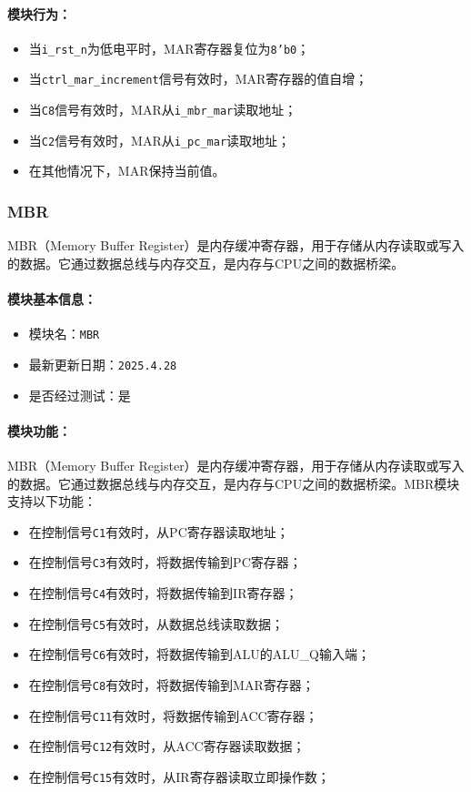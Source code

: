 \documentclass[lang=cn,a4paper,newtx]{elegantpaper}
\begin{document}
\paragraph{模块行为：}
\begin{itemize}
  \item 当\texttt{i\_rst\_n}为低电平时，MAR寄存器复位为\texttt{8'b0}；
  \item 当\texttt{ctrl\_mar\_increment}信号有效时，MAR寄存器的值自增；
  \item 当\texttt{C8}信号有效时，MAR从\texttt{i\_mbr\_mar}读取地址；
  \item 当\texttt{C2}信号有效时，MAR从\texttt{i\_pc\_mar}读取地址；
  \item 在其他情况下，MAR保持当前值。
\end{itemize}
\subsubsection{MBR}
MBR（Memory Buffer Register）是内存缓冲寄存器，用于存储从内存读取或写入的数据。它通过数据总线与内存交互，是内存与CPU之间的数据桥梁。

\paragraph{模块基本信息：}
\begin{itemize}
  \item 模块名：\texttt{MBR}
  \item 最新更新日期：\texttt{2025.4.28}
  \item 是否经过测试：是
\end{itemize}

\paragraph{模块功能：}
MBR（Memory Buffer Register）是内存缓冲寄存器，用于存储从内存读取或写入的数据。它通过数据总线与内存交互，是内存与CPU之间的数据桥梁。MBR模块支持以下功能：
\begin{itemize}
  \item 在控制信号\texttt{C1}有效时，从PC寄存器读取地址；
  \item 在控制信号\texttt{C3}有效时，将数据传输到PC寄存器；
  \item 在控制信号\texttt{C4}有效时，将数据传输到IR寄存器；
  \item 在控制信号\texttt{C5}有效时，从数据总线读取数据；
  \item 在控制信号\texttt{C6}有效时，将数据传输到ALU的ALU\_Q输入端；
  \item 在控制信号\texttt{C8}有效时，将数据传输到MAR寄存器；
  \item 在控制信号\texttt{C11}有效时，将数据传输到ACC寄存器；
  \item 在控制信号\texttt{C12}有效时，从ACC寄存器读取数据；
  \item 在控制信号\texttt{C15}有效时，从IR寄存器读取立即操作数；
\end{itemize}
\end{document}
